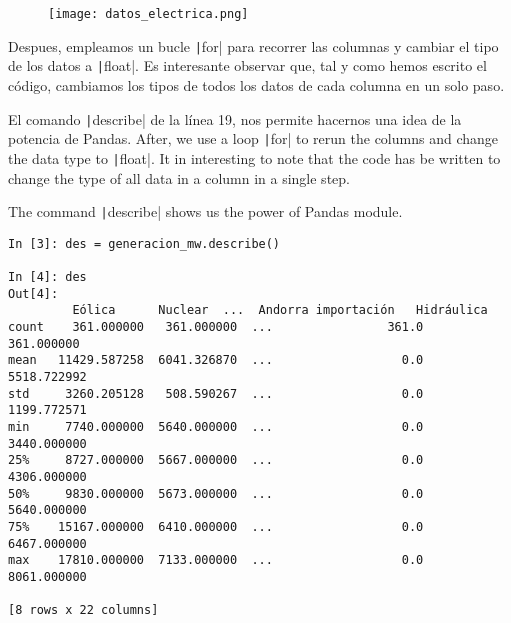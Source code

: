 \begin{figure}
	\centering
	\texttt{[image: datos\_electrica.png]}
	\label{fig:dataf}
\end{figure}

\begin{paracol}{2}
 Despues, empleamos un bucle \texttt|for| para recorrer las columnas y cambiar el tipo de los datos a \texttt|float|. Es interesante observar que, tal y como hemos escrito el código, cambiamos los tipos de todos los datos de cada columna en un solo paso.

El comando \texttt|describe| de la línea 19, nos permite hacernos una idea de la potencia de Pandas.
\switchcolumn
After, we use a loop \texttt|for| to rerun the columns and change the data type to \texttt|float|. It in interesting to note that the code has be written to change the type of all data in a column in a single step.

The command \texttt|describe| shows us the power of Pandas module.
\end{paracol}
\begin{center}
\begin{minipage}{\textwidth}
	\begin{verbatim}
In [3]: des = generacion_mw.describe()

In [4]: des
Out[4]: 
	     Eólica      Nuclear  ...  Andorra importación   Hidráulica
count    361.000000   361.000000  ...                361.0   361.000000
mean   11429.587258  6041.326870  ...                  0.0  5518.722992
std     3260.205128   508.590267  ...                  0.0  1199.772571
min     7740.000000  5640.000000  ...                  0.0  3440.000000
25%     8727.000000  5667.000000  ...                  0.0  4306.000000
50%     9830.000000  5673.000000  ...                  0.0  5640.000000
75%    15167.000000  6410.000000  ...                  0.0  6467.000000
max    17810.000000  7133.000000  ...                  0.0  8061.000000

[8 rows x 22 columns]	\end{verbatim}
\end{minipage}
\end{center} 

